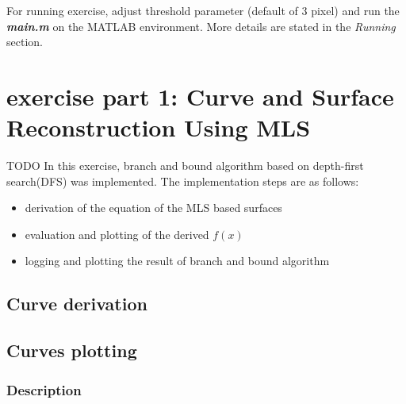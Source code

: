 \documentclass[paper=a4, fontsize=11pt]{scrartcl} %
\numberwithin{equation}{section} %
\numberwithin{figure}{section} %
\numberwithin{table}{section} %
\newcommand{\filename}[1]{\textbf{\textit{#1}}}
\begin{document}
For running exercise, adjust threshold parameter (default of 3 pixel) and run the \filename{main.m} on the MATLAB environment. More details are stated in the \textit{Running} section.


\section{exercise part 1: Curve and Surface Reconstruction Using MLS}

TODO
In this exercise, branch and bound algorithm based on depth-first search(DFS) was implemented. The implementation steps are as follows: 

\begin{itemize}
\item derivation of the equation of the MLS based surfaces 
\item evaluation and plotting of the derived $f(x)$
\item logging and plotting the result of branch and bound algorithm
\end{itemize}  


\subsection{Curve derivation}



\subsection{Curves plotting}

\subsubsection{Description}

\end{document}

